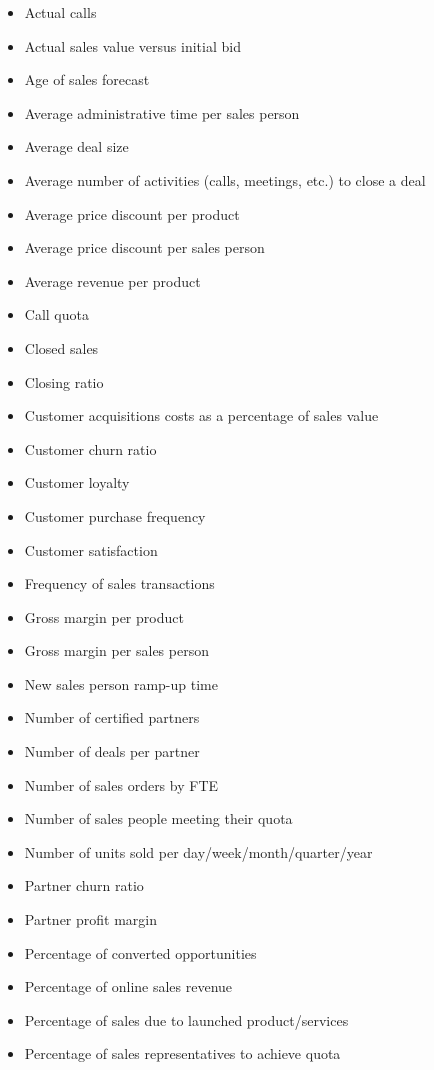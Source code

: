 \documentclass[]{book}
\providecommand{\tightlist}{%
  \setlength{\itemsep}{0pt}\setlength{\parskip}{0pt}}
\begin{document}
\begin{itemize}
\tightlist
\item
  Actual calls
\item
  Actual sales value versus initial bid
\item
  Age of sales forecast
\item
  Average administrative time per sales person
\item
  Average deal size
\item
  Average number of activities (calls, meetings, etc.) to close a deal
\item
  Average price discount per product
\item
  Average price discount per sales person
\item
  Average revenue per product
\item
  Call quota
\item
  Closed sales
\item
  Closing ratio
\item
  Customer acquisitions costs as a percentage of sales value
\item
  Customer churn ratio
\item
  Customer loyalty
\item
  Customer purchase frequency
\item
  Customer satisfaction
\item
  Frequency of sales transactions
\item
  Gross margin per product
\item
  Gross margin per sales person
\item
  New sales person ramp-up time
\item
  Number of certified partners
\item
  Number of deals per partner
\item
  Number of sales orders by FTE
\item
  Number of sales people meeting their quota
\item
  Number of units sold per day/week/month/quarter/year
\item
  Partner churn ratio
\item
  Partner profit margin
\item
  Percentage of converted opportunities
\item
  Percentage of online sales revenue
\item
  Percentage of sales due to launched product/services
\item
  Percentage of sales representatives to achieve quota

\end{itemize}
\end{document}
